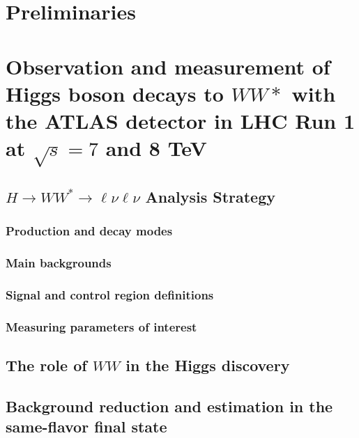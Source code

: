 \documentclass{Dissertate}
\begin{document}

\maketitle
\copyrightpage

\abstractpage
\tableofcontents
\listoffigures
\dedicationpage
\acknowledgments

\doublespacing

\setcounter{chapter}{-1}  %

\part{Preliminaries}



\part{Observation and measurement of Higgs boson decays to $WW*$ with
  the ATLAS detector in LHC Run 1 at $\sqrt{s} = 7$ and 8 TeV}

\chapter{$H\rightarrow WW^{*}\rightarrow \ell\nu\ell\nu$ Analysis Strategy}

\section{Production and decay modes}
\section{Main backgrounds}
\section{Signal and control region definitions}
\section{Measuring parameters of interest}

\chapter{The role of $WW$ in the Higgs discovery}

\chapter{Background reduction and estimation in the same-flavor final state}
\end{document}
